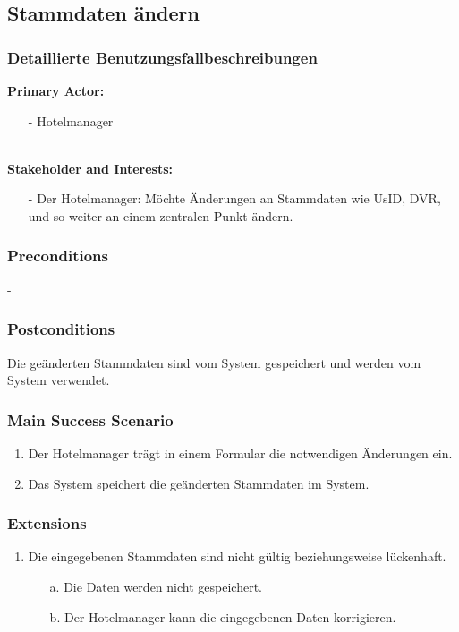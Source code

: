 \documentclass[./detailed_overview_usecases.tex]{subfiles}
\begin{document}
    \subsection{Stammdaten ändern}
    \subsubsection{Detaillierte Benutzungsfallbeschreibungen}
    \textbf{Primary Actor:}
    \begin{itemize}
        \item[-] Hotelmanager
    \end{itemize}
    \\
    \textbf{Stakeholder and Interests:}
    \begin{itemize}
        \item[-] Der Hotelmanager: Möchte Änderungen an Stammdaten wie UsID, DVR, und so weiter an  einem zentralen Punkt ändern.
    \end{itemize}

    \subsubsection*{Preconditions}
    -
    \subsubsection*{Postconditions}
    Die geänderten Stammdaten sind vom System gespeichert und werden vom System verwendet.

    \subsubsection*{Main Success Scenario}
    \begin{enumerate}
        \item Der Hotelmanager trägt in einem Formular die notwendigen Änderungen ein.
        \item Das System speichert die geänderten Stammdaten im System.
    \end{enumerate}

    \subsubsection*{Extensions}
    \begin{enumerate}
        \item Die eingegebenen Stammdaten sind nicht gültig beziehungsweise lückenhaft.
        \begin{itemize}
            \item[a.] Die Daten werden nicht gespeichert.
            \item[b.] Der Hotelmanager kann die eingegebenen Daten korrigieren.
        \end{itemize}
    \end{enumerate}
\end{document}
